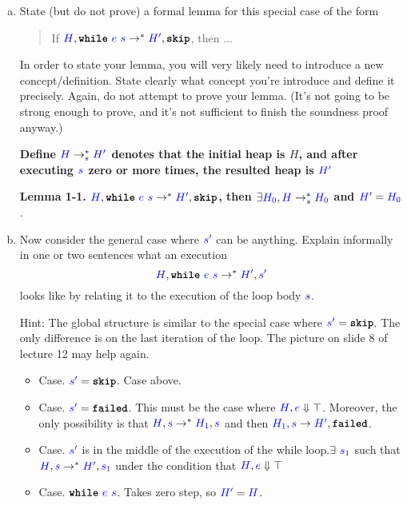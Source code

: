 \documentclass{article}
\theoremstyle{definition}
\newcommand{\meta}[1]{{\color{blue}#1}}
\newcommand{\progtext}[1]{\ensuremath{\text{\ttfamily\bfseries #1}}}
\newcommand{\impskip}{\progtext{skip}}
\newcommand{\failed}{\progtext{failed}}
\newcommand{\while}{\progtext{while}}
\begin{document}
\begin{enumerate}[start=1,label={{\bf Problem \arabic*}.},ref=\arabic*,left=0pt..0pt,widest*=10,align=left,itemindent=*]
\begin{enumerate}[(a),left=1em]
  \item\label{prob:while-to-skip-lemma} State (but do not prove) a formal lemma for this special case of the form
    \begin{quote}
      If $\meta{H}, \while\ \meta{e}\ \meta{s} \to^* \meta{H'},\impskip$, then ...
    \end{quote}
    In order to state your lemma, you will very likely need to introduce a new
    concept/definition.  State clearly what concept you're introduce and define it
    precisely. Again, do not attempt to prove your lemma. (It's not going to be
    strong enough to prove, and it's not sufficient to finish the soundness proof anyway.)

    \textbf{Define $\meta{H}\to_s^* \meta{H^\prime}$ denotes that the initial heap is $H$, and after executing $\meta{s}$ zero or more times, the resulted heap is $\meta{H^\prime}$}

    \textbf{Lemma 1-1. $\meta{H}, \while\ \meta{e}\ \meta{s} \to^* \meta{H'},\impskip$, then $\exists \meta{H_0}, \meta{H}\to_s^* \meta{H_0}$ and $\meta{H^\prime} = \meta{H_0}$}.

  \item Now consider the general case where $\meta{s'}$ can be anything. Explain informally in one or two sentences
    what an execution
    \[
      \meta{H}, \while\ \meta{e}\ \meta{s} \to^* \meta{H'},\meta{s'}
    \]
    looks like by relating it to the execution of the loop body $\meta{s}$.

    Hint: The global structure is similar to the special case where
    $\meta{s'}=\impskip$. The only difference is on the last iteration of the
    loop. The picture on slide 8 of lecture 12 may help again.

    \begin{itemize}
      \item Case. $\meta{s^\prime}=\impskip$. Case above.
      \item Case. $\meta{s^\prime}=\failed$. This must be the case where $\meta{H}, \meta{e} \Downarrow \top$. Moreover, the only possibility is that $\meta{H}, \meta{s} \to^* \meta{H_1}, \meta{s}$ and then $\meta{H_1}, \meta{s} \to \meta{H^\prime}, \failed$.
      \item Case. $\meta{s^\prime}$ is in the middle of the execution of the while loop.$\exists\ \meta{s_1}$ such that $\meta{H}, \meta{s} \to^* \meta{H^\prime}, \meta{s_1}$ under the condition that $\meta{H}, \meta{e} \Downarrow \top$
      \item Case. $\while\ \meta{e}\ \meta{s}$. Takes zero step, so $\meta{H^\prime}=\meta{H}$. 
    \end{itemize}


\end{enumerate}
\end{enumerate}
\end{document}
